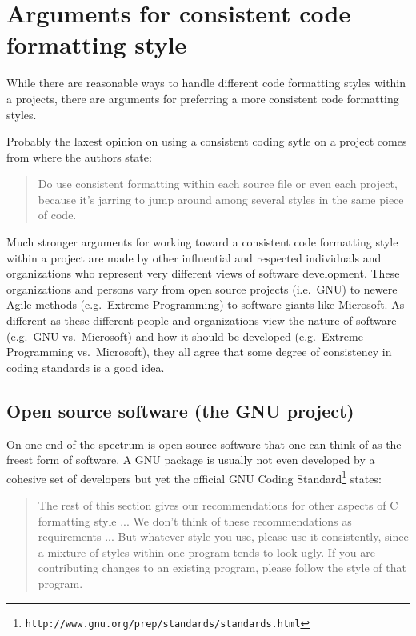 %
\section{Arguments for consistent code formatting style}
\label{sec:arguments-for-consistent-style}
%

While there are reasonable ways to handle different code formatting styles
within a projects, there are arguments for preferring a more consistent code
formatting styles.

Probably the laxest opinion on using a consistent coding sytle on a project
comes from {}\cite[Item 0]{C++CodingStandards05} where the authors state:

\begin{quote}

Do use consistent formatting within each source file or even each project,
because it's jarring to jump around among several styles in the same piece of
code.

\end{quote}

Much stronger arguments for working toward a consistent code formatting style
within a project are made by other influential and respected individuals and
organizations who represent very different views of software development.
These organizations and persons vary from open source projects (i.e.\ GNU) to
newere Agile methods (e.g.\ Extreme Programming) to software giants like
Microsoft.  As different as these different people and organizations view the
nature of software (e.g.\ GNU vs.\ Microsoft) and how it should be developed
(e.g.\ Extreme Programming vs.\ Microsoft), they all agree that some degree of
consistency in coding standards is a good idea.

%
\subsection{Open source software (the GNU project)}
%

On one end of the spectrum is open source software that one can think of as
the freest form of software.  A GNU package is usually not even developed by a
cohesive set of developers but yet the official GNU Coding
Standard\footnote{{}\texttt{http://www.gnu.org/prep/standards/standards.html}}
states:

\begin{quote}

The rest of this section gives our recommendations for other aspects of C
formatting style ... We don't think of these recommendations as requirements
... But whatever style you use, please use it consistently, since a mixture of
styles within one program tends to look ugly. If you are contributing changes
to an existing program, please follow the style of that program.

\end{quote}

